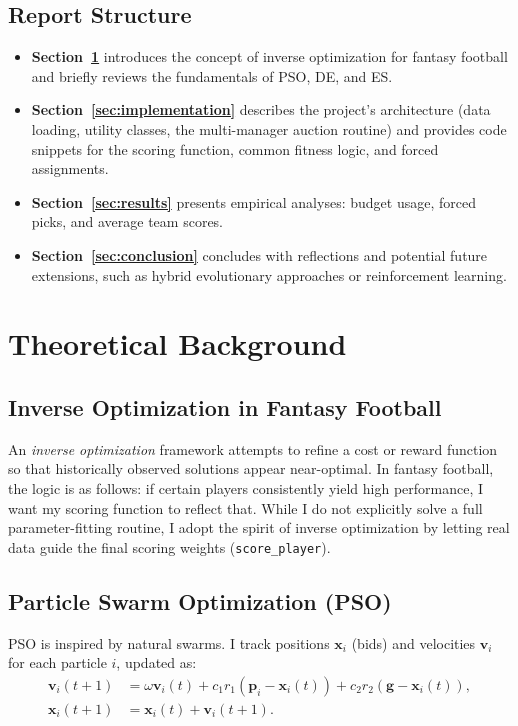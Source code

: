\documentclass[sigconf]{acmart}
\begin{document}
	\subsection{Report Structure}
	\begin{itemize}
\item \textbf{Section~\ref{sec:theory}} introduces the concept of inverse optimization for fantasy football and briefly reviews the fundamentals of PSO, DE, and ES.
\item \textbf{Section~\ref{sec:implementation}} describes the project’s architecture (data loading, utility classes, the multi-manager auction routine) and provides code snippets for the scoring function, common fitness logic, and forced assignments.
\item \textbf{Section~\ref{sec:results}} presents empirical analyses: budget usage, forced picks, and average team scores.
\item \textbf{Section~\ref{sec:conclusion}} concludes with reflections and potential future extensions, such as hybrid evolutionary approaches or reinforcement learning.
	\end{itemize}
	
	\section{Theoretical Background}
	\label{sec:theory}
	
	\subsection{Inverse Optimization in Fantasy Football}
	An \emph{inverse optimization} framework attempts to refine a cost or reward function so that historically observed solutions appear near-optimal. In fantasy football, the logic is as follows: if certain players consistently yield high performance, I want my scoring function to reflect that. While I do not explicitly solve a full parameter-fitting routine, I adopt the spirit of inverse optimization by letting real data guide the final scoring weights (\texttt{score\_player}).
	
	\subsection{Particle Swarm Optimization (PSO)}
	PSO is inspired by natural swarms. I track positions $\mathbf{x}_i$ (bids) and velocities $\mathbf{v}_i$ for each particle $i$, updated as:
	\begin{align*}
		\mathbf{v}_i(t+1) &= \omega \mathbf{v}_i(t)
		+ c_1 r_1 (\mathbf{p}_i - \mathbf{x}_i(t))
		+ c_2 r_2 (\mathbf{g} - \mathbf{x}_i(t)), \\
		\mathbf{x}_i(t+1) &= \mathbf{x}_i(t) + \mathbf{v}_i(t+1).
	\end{align*}
\end{document}
